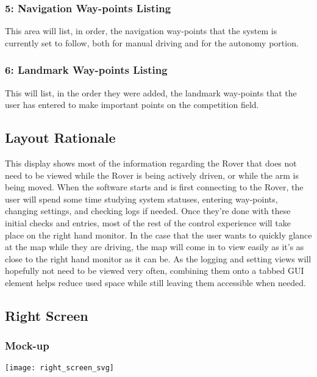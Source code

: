 \subsubsection{5: Navigation Way-points Listing}
This area will list, in order, the navigation way-points that the system is currently set to follow, both for manual driving and for the autonomy portion.

\subsubsection{6: Landmark Way-points Listing}
This will list, in the order they were added, the landmark way-points that the user has entered to make important points on the competition field.

\subsection{Layout Rationale}
This display shows most of the information regarding the Rover that does not need to be viewed while the Rover is being actively driven, or while the arm is being moved.
When the software starts and is first connecting to the Rover, the user will spend some time studying system statuses, entering way-points, changing settings, and checking logs if needed.
Once they're done with these initial checks and entries, most of the rest of the control experience will take place on the right hand monitor.
In the case that the user wants to quickly glance at the map while they are driving, the map will come in to view easily as it's as close to the right hand monitor as it can be.
As the logging and setting views will hopefully not need to be viewed very often, combining them onto a tabbed GUI element helps reduce used space while still leaving them accessible when needed.


\subsection{Right Screen}
\subsubsection{Mock-up}
\vspace{1em}
\begin{minipage}{\linewidth}
  \begin{center}
  \texttt{[image: right\_screen\_svg]}
  \end{center}
\end{minipage}

